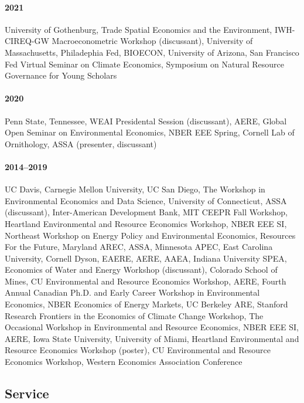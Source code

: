\documentclass[12pt]{res} %
\begin{document}
\begin{resume}
\paragraph{2021} University of Gothenburg, Trade Spatial Economics and the Environment, IWH-CIREQ-GW Macroeconometric Workshop (discussant), University of Massachusetts, Philadephia Fed, BIOECON, University of Arizona, San Francisco Fed Virtual Seminar on Climate Economics, Symposium on Natural Resource Governance for Young Scholars \vspace{-.2in}
\paragraph{2020} Penn State, Tennessee, WEAI Presidental Session (discussant), AERE, Global Open Seminar on Environmental Economics, NBER EEE Spring, Cornell Lab of Ornithology, ASSA (presenter, discussant) \vspace{-.2in}
\paragraph{2014--2019} UC Davis, Carnegie Mellon University, UC San Diego, The Workshop in Environmental Economics and Data Science, University of Connecticut, ASSA (discussant), Inter-American Development Bank, MIT CEEPR Fall Workshop, Heartland Environmental and Resource Economics Workshop, NBER EEE SI, Northeast Workshop on Energy Policy and Environmental Economics, Resources For the Future, Maryland AREC, ASSA, Minnesota APEC, East Carolina University, Cornell Dyson, EAERE, AERE, AAEA, Indiana University SPEA, Economics of Water and Energy Workshop (discussant), Colorado School of Mines, CU Environmental and Resource Economics Workshop, AERE, Fourth Annual Canadian Ph.D. and Early Career Workshop in Environmental Economics, NBER Economics of Energy Markets, UC Berkeley ARE, Stanford Research Frontiers in the Economics of Climate Change Workshop, The Occasional Workshop in Environmental and Resource Economics, NBER EEE SI, AERE, Iowa State University, University of Miami, Heartland Environmental and Resource Economics Workshop (poster), CU Environmental and Resource Economics Workshop, Western Economics Association Conference

\vspace{-.2in}

\subsection{Service}\vspace{-.2in}

\end{resume}
\end{document}
